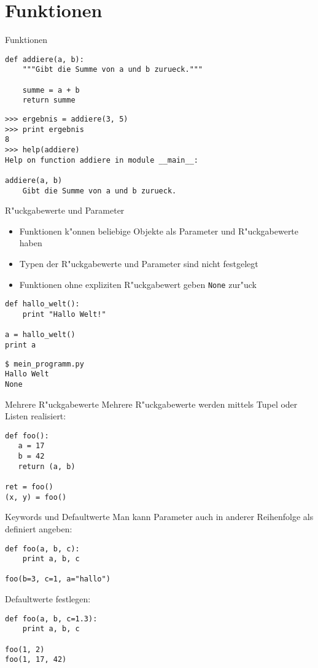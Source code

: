 \section{Funktionen}

\begin{frame}[fragile]{Funktionen}
\begin{lstlisting}[style=Python]
def addiere(a, b):
    """Gibt die Summe von a und b zurueck."""

    summe = a + b
    return summe
\end{lstlisting}

\begin{lstlisting}[style=Shell]
>>> ergebnis = addiere(3, 5)
>>> print ergebnis
8
>>> help(addiere)
Help on function addiere in module __main__:

addiere(a, b)
    Gibt die Summe von a und b zurueck.
\end{lstlisting}
\end{frame}

\begin{frame}[fragile]{R"uckgabewerte und Parameter}
\begin{itemize}
\item Funktionen k"onnen beliebige Objekte als Parameter und R"uckgabewerte haben
\item Typen der R"uckgabewerte und Parameter sind nicht festgelegt
\item Funktionen ohne expliziten R"uckgabewert geben \lstinline{None} zur"uck
\end{itemize}
\begin{lstlisting}[style=Python]
def hallo_welt():
    print "Hallo Welt!"

a = hallo_welt()
print a
\end{lstlisting}
\begin{lstlisting}[style=Shell]
$ mein_programm.py
Hallo Welt
None
\end{lstlisting} %
\end{frame}

\begin{frame}[fragile]{Mehrere R"uckgabewerte}
Mehrere R"uckgabewerte werden mittels Tupel oder Listen realisiert:
\begin{lstlisting}[style=Python]
def foo():
   a = 17
   b = 42
   return (a, b)

ret = foo()
(x, y) = foo()
\end{lstlisting}
\end{frame}

\begin{frame}[fragile]{Keywords und Defaultwerte}
Man kann Parameter auch in anderer Reihenfolge als definiert angeben:
\begin{lstlisting}[style=Python]
def foo(a, b, c):
    print a, b, c

foo(b=3, c=1, a="hallo")
\end{lstlisting}
Defaultwerte festlegen:
\begin{lstlisting}[style=Python]
def foo(a, b, c=1.3):
    print a, b, c

foo(1, 2)
foo(1, 17, 42)
\end{lstlisting}
\end{frame}

